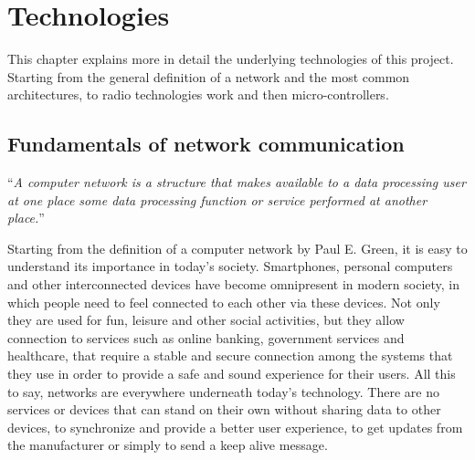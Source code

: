 


\chapter{Technologies}\label{chapter:technologies}
	
	This chapter explains more in detail the underlying technologies of this project.
	Starting from the general definition of a network and the most common architectures, to radio technologies work and then micro-controllers.
	
\section{Fundamentals of network communication}
	
	\begin{center}
		\begin{minipage}[H]{0.9\columnwidth}
			\begin{center}
				``\textit{A computer network is a structure that makes available to a data processing user at one place some data processing function or service performed at another place.}''~\cite{nla.cat-vn252493}
			\end{center}
		\end{minipage}
	\end{center}
	
	Starting from the definition of a computer network by Paul E. Green, it is easy to understand its importance in today's society.
	Smartphones, personal computers and other interconnected devices have become omnipresent in modern society, in which people need to feel connected to each other via these devices.
	Not only they are used for fun, leisure and other social activities, but they allow connection to services such as online banking, government services and healthcare, that require a stable and secure connection among the systems that they use in order to provide a safe and sound experience for their users.
	All this to say, networks are everywhere underneath today's technology.
	There are no services or devices that can stand on their own without sharing data to other devices, to synchronize and provide a better user experience, to get updates from the manufacturer or simply to send a keep alive message.
	
